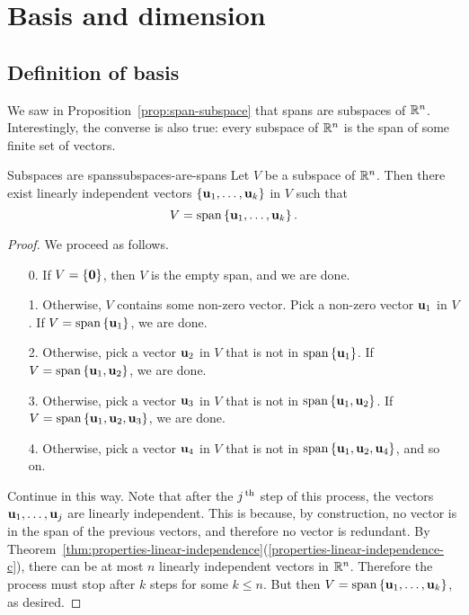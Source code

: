 \section{Basis and dimension}

\subsection{Definition of basis}

We saw in Proposition~\ref{prop:span-subspace} that spans are
subspaces of\/ $\mathbb{R}^n$. Interestingly, the converse is also true: every
subspace of\/ $\mathbb{R}^n$ is the span of some finite set of vectors.

\begin{theorem}{Subspaces are spans}{subspaces-are-spans}
  Let $V$ be a subspace of\/ $\mathbb{R}^n$. Then there exist linearly
  independent vectors $\left\{\mbox{\bf u}_{1},\ldots,\mbox{\bf u}_{k}\right\}$ in $V$
  such that
  \begin{equation*}
    V= \sspan\set{\vect{u}_{1},\ldots ,\vect{u}_{k}}. 
  \end{equation*}
  \vspace{-3ex}
\end{theorem}

\begin{proof}
  We proceed as follows.
  \begin{enumerate}
  \item[0.] If $V=\left\{\mbox{\bf 0}\right\}$, then $V$ is the empty span, and we
    are done.
  \item[1.] Otherwise, $V$ contains some non-zero vector.  Pick a
    non-zero vector $\mbox{\bf u}_{1}$ in $V$. If
    $V=\sspan\set{\vect{u}_{1}}$, we are done.
  \item[2.] Otherwise, pick a vector $\mbox{\bf u}_{2}$ in $V$ that is not
    in $\sspan\set{\vect{u}_{1}}$. If
    $V=\sspan\set{\vect{u}_{1},\vect{u}_{2}}$, we are done.
  \item[3.] Otherwise, pick a vector $\mbox{\bf u}_{3}$ in $V$ that is not
    in $\sspan\set{\vect{u}_{1},\vect{u}_{2}}$. If
    $V=\sspan\set{\vect{u}_{1},\vect{u}_{2},\vect{u}_{3}}$, we are done.
  \item[4.] Otherwise, pick a vector $\mbox{\bf u}_{4}$ in $V$ that is not
    in $\sspan\set{\vect{u}_{1},\vect{u}_{2},\vect{u}_{4}}$, and so on.
  \end{enumerate}
  Continue in this way. Note that after the $j^{\,\rm th}$ step of this
  process, the vectors $\mbox{\bf u}_1,\ldots,\mbox{\bf u}_j$ are linearly
  independent. This is because, by construction, no vector is in the
  span of the previous vectors, and therefore no vector is redundant.
  By
  Theorem~\ref{thm:properties-linear-independence}(\ref{properties-linear-independence-c}),
  there can be at most $n$ linearly independent vectors in $\mathbb{R}^n$.
  Therefore the process must stop after $k$ steps for some $k\leq
  n$. But then $V=\sspan\set{\vect{u}_{1},\ldots ,\vect{u}_{k}}$, as
  desired.
\end{proof}

